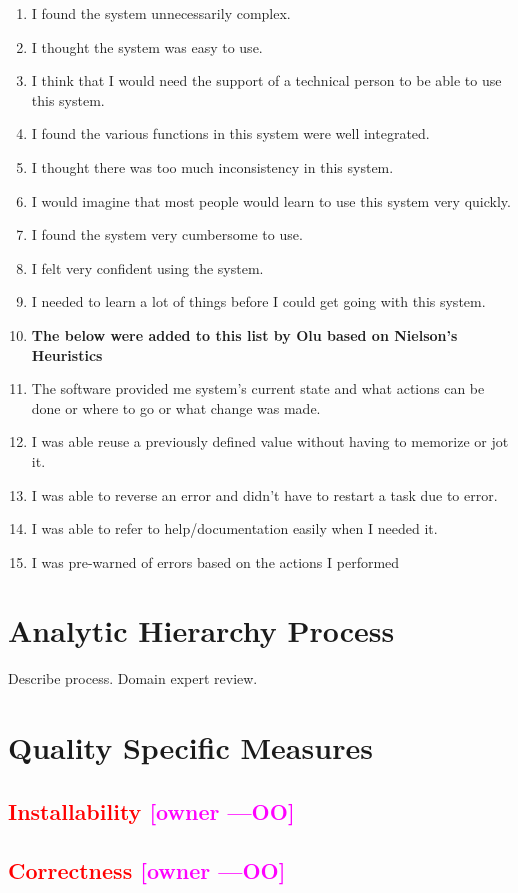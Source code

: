 \documentclass[letterpaper,cleveref]{lipics-v2019}
\newcommand{\authornote}[3]{\textcolor{#1}{[#3 ---#2]}}
\newcommand{\authornote}[3]{}
\newcommand{\oo}[1]{\authornote{magenta}{OO}{#1}} %
\newcommand{\notdone}[1]{\textcolor{red}{#1}}
\theoremstyle{definition}
\begin{document}
\begin {enumerate}
\item I found the system unnecessarily complex.
\item I thought the system was easy to use.
\item I think that I would need the support of a technical person to be able to use this system.
\item I found the various functions in this system were well integrated.
\item I thought there was too much inconsistency in this system.
\item I would imagine that most people would learn to use this system very quickly.
\item I found the system very cumbersome to use.
\item I felt very confident using the system.
\item I needed to learn a lot of things before I could get going with this system.
\item \textbf{The below were added to this list by Olu based on Nielson's Heuristics}
\item The software provided me system's current state and what actions can be done or where to go or what change was made.
\item I was able reuse a previously defined value without having to memorize or jot it.
\item I was able to reverse an error and didn't have to restart a task due to error.
\item I was able to refer to help/documentation easily when I needed it.
\item I was pre-warned of errors based on the actions I performed
\end {enumerate}
\section{Analytic Hierarchy Process}

Describe process.  Domain expert review.

\section{Quality Specific Measures}

\subsection{\notdone{Installability} \oo{owner}}

\subsection{\notdone{Correctness} \oo{owner}}
\end{document}
